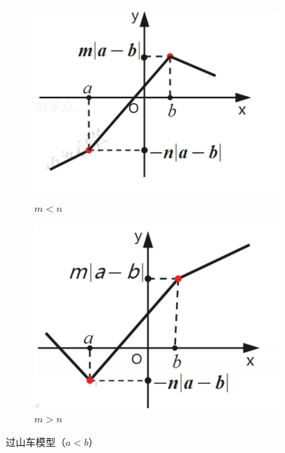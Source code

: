 \documentclass[a4paper,openany]{ctexbook}
\begin{document}
\begin{figure}
    \centering
    \begin{subfigure}{0.45\textwidth}
        \centering
        \includegraphics[width=\textwidth]{image22.png}
        \caption{\(m<n\)}
    \end{subfigure}
    \hfill
    \begin{subfigure}{0.45\textwidth}
        \centering
        \includegraphics[width=\textwidth]{image23.png}
        \caption{\(m>n\)}
    \end{subfigure}
    \caption{过山车模型（\(a<b\)）}\label{fgr:goujiemoxk1}
\end{figure}
\end{document}
